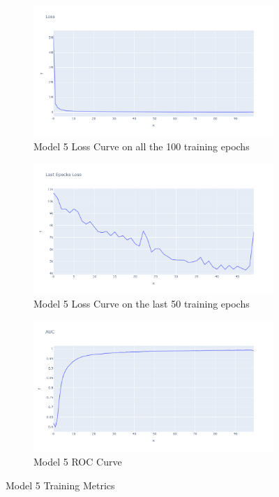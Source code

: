 \begin{figure}[H]%
    \centering
    \begin{subfigure}{0.49\textwidth}
        \centering
        \includegraphics[width=\linewidth]{figures/ev/do_1_tloss.png}
        \caption{Model 5 Loss Curve on all the 100 training epochs}
    \label{fig:do_1_tloss}
    \end{subfigure}
    \begin{subfigure}{0.49\textwidth}
        \centering
         \includegraphics[width=\linewidth]{figures/ev/do_1_ploss.png}
        \caption{Model 5 Loss Curve on the last 50 training epochs}
    \label{fig:do_1_ploss}
    \end{subfigure}
    \begin{subfigure}{0.49\textwidth}
        \centering
        \includegraphics[width=\linewidth]{figures/ev/do_1_auc.png}
        \caption{Model 5 ROC Curve}
    \label{fig:do_1_auc}
    \end{subfigure}
    \captionsetup{font=large}
\caption{Model 5 Training Metrics}
 \label{fig:5_tr}
\end{figure}
